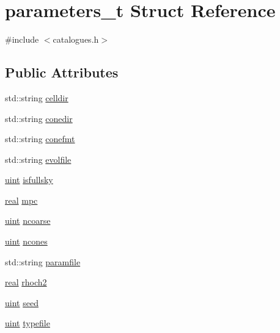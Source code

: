 \hypertarget{structparameters__t}{\section{parameters\-\_\-t Struct Reference}
\label{structparameters__t}
}


{\ttfamily \#include $<$catalogues.\-h$>$}

\subsection*{Public Attributes}
\begin{DoxyCompactItemize}
\item 
std\-::string \hyperlink{structparameters__t_a385fab9a33c11108c0dd32779cf1516b}{celldir}
\item 
std\-::string \hyperlink{structparameters__t_a2fc3c866ee5125b1c9d80056013974b1}{conedir}
\item 
std\-::string \hyperlink{structparameters__t_aa3f6be07e2d2c6318aff7b4cd1737eaf}{conefmt}
\item 
std\-::string \hyperlink{structparameters__t_adcf1d6707b7f5d531d7c30611c6b84a0}{evolfile}
\item 
\hyperlink{miscellaneous_8h_a69aa29b598b851b0640aa225a9e5d61d}{uint} \hyperlink{structparameters__t_ab2923e9ecd71bbee7e159e7c77c70b47}{isfullsky}
\item 
\hyperlink{miscellaneous_8h_aedc0ad84d1e764530814f57ad931d02a}{real} \hyperlink{structparameters__t_ac1b1b8d724f01a87e4549a883c574ec1}{mpc}
\item 
\hyperlink{miscellaneous_8h_a69aa29b598b851b0640aa225a9e5d61d}{uint} \hyperlink{structparameters__t_abf2ebb68923c70eb2389c50ce8f53a81}{ncoarse}
\item 
\hyperlink{miscellaneous_8h_a69aa29b598b851b0640aa225a9e5d61d}{uint} \hyperlink{structparameters__t_a5e660d96bf41704749fe5dbaaf9b04d7}{ncones}
\item 
std\-::string \hyperlink{structparameters__t_ae04d4dc19be412efe62acce66c9a7d3b}{paramfile}
\item 
\hyperlink{miscellaneous_8h_aedc0ad84d1e764530814f57ad931d02a}{real} \hyperlink{structparameters__t_a07a9ffceae1d7ad8ddf7c1d1c68968a7}{rhoch2}
\item 
\hyperlink{miscellaneous_8h_a69aa29b598b851b0640aa225a9e5d61d}{uint} \hyperlink{structparameters__t_a10258b554f6041b308f82124613413d2}{seed}
\item 
\hyperlink{miscellaneous_8h_a69aa29b598b851b0640aa225a9e5d61d}{uint} \hyperlink{structparameters__t_a1419657bb8c34f5d2e9bddb776a3d174}{typefile}

\end{DoxyCompactItemize}
